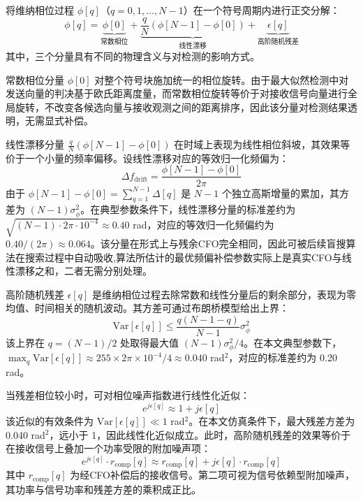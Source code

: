将维纳相位过程 $\phi[q]$（$q = 0, 1, \ldots, N-1$）在一个符号周期内进行正交分解：
\begin{equation}
    \phi[q] = \underbrace{\phi[0]}_{\text{常数相位}} + \underbrace{\frac{q}{N}\left(\phi[N-1]-\phi[0]\right)}_{\text{线性漂移}} + \underbrace{\epsilon[q]}_{\text{高阶随机残差}}
    \label{eq:phase_noise_decomposition}
\end{equation}
其中，三个分量具有不同的物理含义与对检测的影响方式。

常数相位分量 $\phi[0]$ 对整个符号块施加统一的相位旋转。由于最大似然检测中对发送向量的判决基于欧氏距离度量，而常数相位旋转等价于对接收信号向量进行全局旋转，不改变各候选向量与接收观测之间的距离排序，因此该分量对检测结果透明，无需显式补偿。

线性漂移分量 $\frac{q}{N}(\phi[N-1]-\phi[0])$ 在时域上表现为线性相位斜坡，其效果等价于一个小量的频率偏移。设线性漂移对应的等效归一化频偏为：
\begin{equation}
    \Delta f_{\mathrm{drift}} = \frac{\phi[N-1]-\phi[0]}{2\pi}
    \label{eq:linear_drift_freq}
\end{equation}
由于 $\phi[N-1]-\phi[0] = \sum_{q=1}^{N-1}\Delta[q]$ 是 $N-1$ 个独立高斯增量的累加，其方差为 $(N-1)\sigma_\phi^2$。在典型参数条件下，线性漂移分量的标准差约为 $\sqrt{(N-1) \cdot 2\pi \cdot 10^{-4}} \approx 0.40$ rad，对应的等效归一化频偏约为 $0.40/(2\pi) \approx 0.064$。该分量在形式上与残余CFO完全相同，因此可被后续盲搜算法在搜索过程中自动吸收,算法所估计的最优频偏补偿参数实际上是真实CFO与线性漂移之和，二者无需分别处理。

高阶随机残差 $\epsilon[q]$ 是维纳相位过程去除常数和线性分量后的剩余部分，表现为零均值、时间相关的随机波动。其方差可通过布朗桥模型给出上界：
\begin{equation}
    \mathrm{Var}[\epsilon[q]] \leq \frac{q(N-1-q)}{N-1} \sigma_\phi^2
    \label{eq:residual_variance_bound}
\end{equation}
该上界在 $q = (N-1)/2$ 处取得最大值 $(N-1)\sigma_\phi^2/4$。在本文典型参数下，$\max_q \mathrm{Var}[\epsilon[q]] \approx 255 \times 2\pi \times 10^{-4}/4 \approx 0.040$ rad$^2$，对应的标准差约为 0.20 rad。

当残差相位较小时，可对相位噪声指数进行线性化近似：
\begin{equation}
    e^{j\epsilon[q]} \approx 1 + j\epsilon[q]
    \label{eq:phase_noise_linearization}
\end{equation}
该近似的有效条件为 $\mathrm{Var}[\epsilon[q]] \ll 1$ rad$^2$。在本文仿真条件下，最大残差方差为 0.040 rad$^2$，远小于 1，因此线性化近似成立。此时，高阶随机残差的效果等价于在接收信号上叠加一个功率受限的附加噪声项：
\begin{equation}
    e^{j\epsilon[q]} \cdot r_{\mathrm{comp}}[q] \approx r_{\mathrm{comp}}[q] + j\epsilon[q] \cdot r_{\mathrm{comp}}[q]
    \label{eq:residual_as_noise}
\end{equation}
其中 $r_{\mathrm{comp}}[q]$ 为经CFO补偿后的接收信号。第二项可视为信号依赖型附加噪声，其功率与信号功率和残差方差的乘积成正比。

